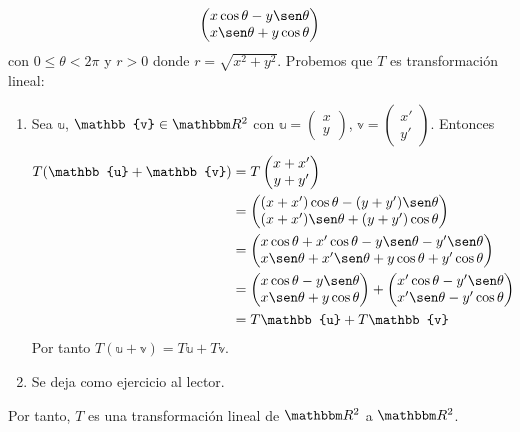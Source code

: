 \begin{example}
\begin{align*}
\begin{pmatrix}
            x \cos \theta - y \sen \theta \\
            x \sen \theta + y \cos \theta
        \end{pmatrix}
    \end{align*}
    con $0 \leq \theta < 2 \pi$ y $r > 0$ donde $r = \sqrt{x^2+y^2}$. Probemos que $T$ es transformación lineal:
    \begin{enumerate}[label=\roman*)]
        \item Sea $\mathbb{u}$, $\mathbb{v} \in \RR[2]$ con $\mathbb{u} = \begin{pmatrix}
            x \\
            y
        \end{pmatrix}$, $\mathbb{v} = \begin{pmatrix}
            x' \\
            y'
        \end{pmatrix}$. Entonces
        \begin{align*}
            T(\mathbb{u} + \mathbb{v}) & = T \begin{pmatrix}
                x + x' \\
                y + y'
            \end{pmatrix} \\
            & = \begin{pmatrix}
                (x + x') \cos \theta - (y + y') \sen \theta \\
                (x + x') \sen \theta + (y + y') \cos \theta
            \end{pmatrix} \\
            & = \begin{pmatrix}
                x \cos \theta + x' \cos \theta - y \sen \theta - y' \sen \theta \\
                x \sen \theta + x' \sen \theta + y \cos \theta + y' \cos \theta
            \end{pmatrix} \\
            & = \begin{pmatrix}
                x \cos \theta - y \sen \theta \\
                x \sen \theta + y \cos \theta
            \end{pmatrix} + \begin{pmatrix}
                x' \cos \theta - y' \sen \theta \\
                x' \sen \theta - y' \cos \theta
            \end{pmatrix} \\
            & = T\mathbb{u} + T\mathbb{v}
        \end{align*}
        Por tanto $T(\mathbb{u} + \mathbb{v}) = T\mathbb{u} + T\mathbb{v}$.
        \item Se deja como ejercicio al lector.
    \end{enumerate}
    Por tanto, $T$ es una transformación lineal de $\RR[2]$ a $\RR[2]$.
\end{example}


